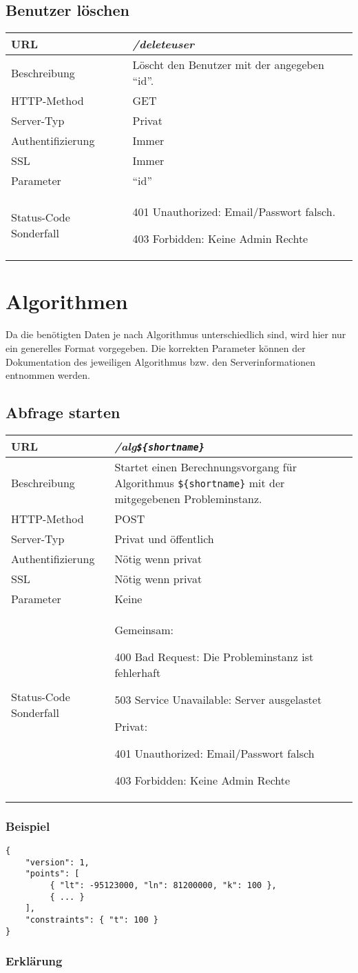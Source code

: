 \documentclass[ngerman,titlepage,parskip=true]{scrartcl}
\newcommand{\requestURL}[1]{\textit{#1}}
\newcommand{\request}[9]
{\subsection{#1}
\begin{tabular}{|p{0.2\textwidth}|p{0.7\textwidth}|}
\hline
  URL & \requestURL{#2}\\\hline
    Beschreibung & #3\\\hline
  HTTP-Method & #4\\\hline
  Server-Typ & #5\\\hline
  Authentifizierung & #6\\\hline
  SSL & #7\\\hline
  Parameter & #8\\\hline
  Status-Code Sonderfall & #9\\\hline
 \end{tabular}\vspace*{1em}}
{}%
{}%
{}%
{}%
{}%
{}%
{}%
{}%
\begin{document}
\request{Benutzer löschen}%
{/deleteuser}%
{Löscht den Benutzer mit der angegeben ``id''.}%
{GET}%
{Privat}%
{Immer}%
{Immer}%
{``id''}%
{401 Unauthorized: Email/Passwort falsch.\par
 403 Forbidden: Keine Admin Rechte}%
\clearpage
   	
\section{Algorithmen}

Da die benötigten Daten je nach Algorithmus unterschiedlich sind, wird hier nur ein generelles Format vorgegeben. Die korrekten Parameter können der Dokumentation des jeweiligen Algorithmus bzw. den Serverinformationen entnommen werden.

\request{Abfrage starten}%
{/alg\texttt{\$\{shortname\}}}%
{Startet einen Berechnungsvorgang für Algorithmus \texttt{\$\{shortname\}} mit der mitgegebenen Probleminstanz.}%
{POST}%
{Privat und öffentlich}%
{Nötig wenn privat}%
{Nötig wenn privat}%
{Keine}%
{Gemeinsam:\par
400 Bad Request: Die Probleminstanz ist fehlerhaft\par
503 Service Unavailable: Server ausgelastet\par
Privat:\par
 401 Unauthorized: Email/Passwort falsch\par
 403 Forbidden: Keine Admin Rechte}%

\subsubsection{Beispiel}
	\begin{lstlisting}
{
    "version": 1,
    "points": [
         { "lt": -95123000, "ln": 81200000, "k": 100 },
         { ... }
    ],
    "constraints": { "t": 100 }
}    	
	\end{lstlisting}
	
		\subsubsection*{Erklärung}
	
\end{document}
